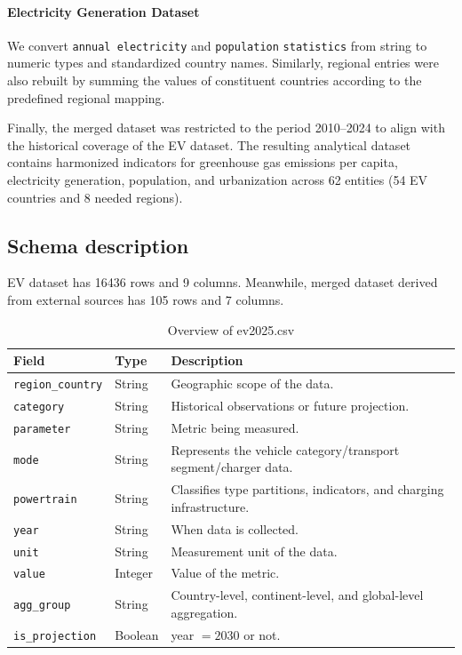 \documentclass[12pt,conference]{IEEEtran}
\begin{document}
\paragraph{Electricity Generation Dataset \cite{owid2025energy}} We convert \texttt{annual electricity} and \texttt{population} \texttt{statistics} from string to numeric types and standardized country names. Similarly, regional entries were also rebuilt by summing the values of constituent countries according to the predefined regional mapping. 

Finally, the merged dataset was restricted to the period 2010–2024 to align with the historical coverage of the EV dataset. The resulting analytical dataset contains harmonized indicators for greenhouse gas emissions per capita, electricity generation, population, and urbanization across 62 entities (54 EV countries and 8 needed regions).

\subsection{Schema description}
EV dataset has 16436 rows and 9 columns. Meanwhile, merged dataset derived from external sources has 105 rows and 7 columns.

\begin{table}[htpb]
  \centering
  \caption{Overview of ev2025.csv}
  \label{tab:dataset}
  \begin{tabular}{|l|l|p{3.8cm}|}
    \hline
    \textbf{Field} & \textbf{Type}   & \textbf{Description} \\
    \hline
    \texttt{region\_country}        & String     & Geographic scope of the data. \\
    \hline
    \texttt{category} & String   & Historical observations or future projection. \\
    \hline
    \texttt{parameter}  & String & Metric being measured. \\
    \hline
    \texttt{mode}     & String    & Represents the vehicle category/transport segment/charger data. \\
    \hline
    \texttt{powertrain}  & String & Classifies type partitions, indicators, and charging infrastructure. \\
    \hline
    \texttt{year}  & String & When data is collected. \\
    \hline
    \texttt{unit}  & String & Measurement unit of the data. \\
    \hline
    \texttt{value}  & Integer & Value of the metric. \\
    \hline
    \texttt{agg\_group}  & String & Country-level, continent-level, and global-level aggregation.\\
    \hline
    \texttt{is\_projection} & Boolean & year \(= 2030\) or not. \\
    \hline
  \end{tabular}
\end{table}
\end{document}
